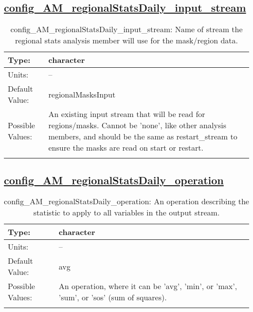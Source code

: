 \subsection[config\_AM\_regionalStatsDaily\_input\_stream]{\hyperref[sec:nm_tab_AM_regionalStatsDaily]{config\_AM\_regionalStatsDaily\_input\_stream}}
\label{subsec:nm_sec_config_AM_regionalStatsDaily_input_stream}
\begin{center}
\begin{longtable}{| p{2.0in} || p{4.0in} |}
    \hline
    Type: & character \\
    \hline
    Units: & -- \\
    \hline
    Default Value: & regionalMasksInput \\
    \hline
    Possible Values: & An existing input stream that will be read for regions/masks. Cannot be 'none', like other analysis members, and should be the same as restart\_stream to ensure the masks are read on start or restart. \\
    \hline
    \caption{config\_AM\_regionalStatsDaily\_input\_stream: Name of stream the regional stats analysis member will use for the mask/region data.}
\end{longtable}
\end{center}
\subsection[config\_AM\_regionalStatsDaily\_operation]{\hyperref[sec:nm_tab_AM_regionalStatsDaily]{config\_AM\_regionalStatsDaily\_operation}}
\label{subsec:nm_sec_config_AM_regionalStatsDaily_operation}
\begin{center}
\begin{longtable}{| p{2.0in} || p{4.0in} |}
    \hline
    Type: & character \\
    \hline
    Units: & -- \\
    \hline
    Default Value: & avg \\
    \hline
    Possible Values: & An operation, where it can be 'avg', 'min', or 'max', 'sum', or 'sos' (sum of squares). \\
    \hline
    \caption{config\_AM\_regionalStatsDaily\_operation: An operation describing the statistic to apply to all variables in the output stream.}
\end{longtable}
\end{center}

